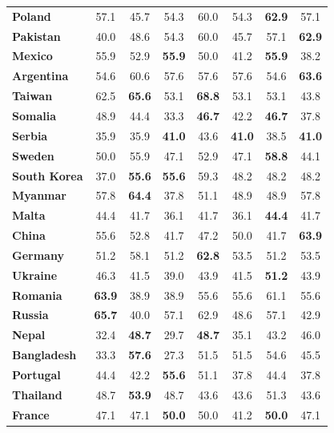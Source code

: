 \begin{table}
{\begin{tabular}{lccccccc}
    \textbf{Poland} & 57.1 & 45.7 & 54.3 & 60.0 & 54.3 & \textbf{62.9} & 57.1 \\
    \textbf{Pakistan} & 40.0 & 48.6 & 54.3 & 60.0 & 45.7 & 57.1 & \textbf{62.9} \\
    \textbf{Mexico} & 55.9 & 52.9 & \textbf{55.9} & 50.0 & 41.2 & \textbf{55.9} & 38.2 \\
    \textbf{Argentina} & 54.6 & 60.6 & 57.6 & 57.6 & 57.6 & 54.6 & \textbf{63.6} \\
    \textbf{Taiwan} & 62.5 & \textbf{65.6} & 53.1 & \textbf{68.8} & 53.1 & 53.1 & 43.8 \\
    \textbf{Somalia} & 48.9 & 44.4 & 33.3 & \textbf{46.7} & 42.2 & \textbf{46.7} & 37.8 \\
    \textbf{Serbia} & 35.9 & 35.9 & \textbf{41.0} & 43.6 & \textbf{41.0} & 38.5 & \textbf{41.0} \\
    \textbf{Sweden} & 50.0 & 55.9 & 47.1 & 52.9 & 47.1 & \textbf{58.8} & 44.1 \\
    \textbf{South Korea} & 37.0 & \textbf{55.6} & \textbf{55.6} & 59.3 & 48.2 & 48.2 & 48.2 \\
    \textbf{Myanmar} & 57.8 & \textbf{64.4} & 37.8 & 51.1 & 48.9 & 48.9 & 57.8 \\
    \textbf{Malta} & 44.4 & 41.7 & 36.1 & 41.7 & 36.1 & \textbf{44.4} & 41.7 \\
    \textbf{China} & 55.6 & 52.8 & 41.7 & 47.2 & 50.0 & 41.7 & \textbf{63.9} \\
    \textbf{Germany} & 51.2 & 58.1 & 51.2 & \textbf{62.8} & 53.5 & 51.2 & 53.5 \\
    \textbf{Ukraine} & 46.3 & 41.5 & 39.0 & 43.9 & 41.5 & \textbf{51.2} & 43.9 \\
    \textbf{Romania} & \textbf{63.9} & 38.9 & 38.9 & 55.6 & 55.6 & 61.1 & 55.6 \\
    \textbf{Russia} & \textbf{65.7} & 40.0 & 57.1 & 62.9 & 48.6 & 57.1 & 42.9 \\
    \textbf{Nepal} & 32.4 & \textbf{48.7} & 29.7 & \textbf{48.7} & 35.1 & 43.2 & 46.0 \\
    \textbf{Bangladesh} & 33.3 & \textbf{57.6} & 27.3 & 51.5 & 51.5 & 54.6 & 45.5 \\
    \textbf{Portugal} & 44.4 & 42.2 & \textbf{55.6} & 51.1 & 37.8 & 44.4 & 37.8 \\
    \textbf{Thailand} & 48.7 & \textbf{53.9} & 48.7 & 43.6 & 43.6 & 51.3 & 43.6 \\
    \textbf{France} & 47.1 & 47.1 & \textbf{50.0} & 50.0 & 41.2 & \textbf{50.0} & 47.1 \\

\end{tabular}}
\end{table}
